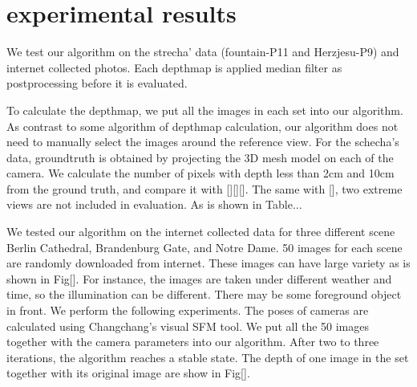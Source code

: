 \section{experimental results} \label{sec:experiment}

We test our algorithm on the strecha' data (fountain-P11 and Herzjesu-P9) and internet collected photos. Each depthmap is applied median filter as postprocessing before it is evaluated.

To calculate the depthmap, we put all the images in each set into our algorithm. As contrast to some algorithm of depthmap calculation, our algorithm does not need to manually select the images around the reference view. For the schecha's data, groundtruth is obtained by projecting the 3D mesh model on each of the camera. We calculate the number of pixels with depth less than 2cm and 10cm from the ground truth, and compare it with [][][]. The same with [], two extreme views are not included in evaluation. As is shown in Table...


We tested our algorithm on the internet collected data for three different scene Berlin Cathedral, Brandenburg Gate, and Notre Dame. 50 images for each scene are randomly downloaded from internet. These images can have large variety as is shown in Fig[]. For instance, the images are taken under different weather and time, so the illumination can be different. There may be some foreground object in front. We perform the following experiments. The poses of cameras are calculated using Changchang's visual SFM tool. We put all the 50 images together with the camera parameters into our algorithm. After two to three iterations, the algorithm reaches a stable state. The depth of one image in the set together with its original image are show in Fig[].






